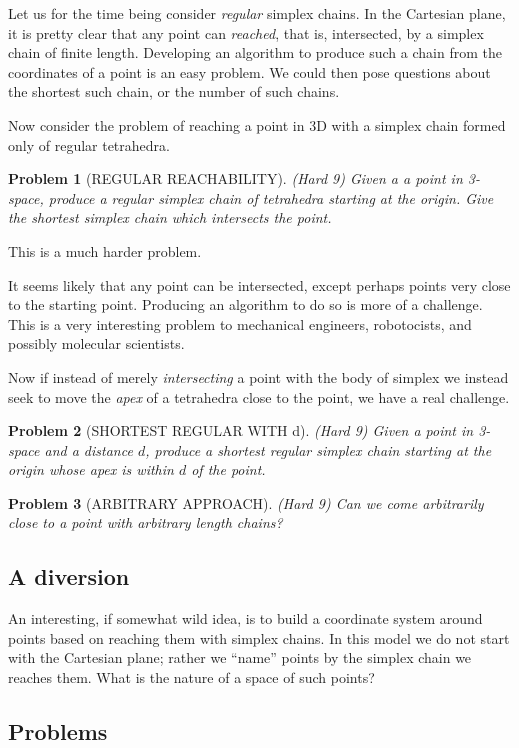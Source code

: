\documentclass[11pt]{article}
\newtheorem{problem}{Problem}
\begin{document}
Let us for the time being consider {\em regular} simplex chains.  In the Cartesian plane, it is pretty clear that any point can {\em reached},
that is, intersected, by a simplex chain of finite length. Developing an algorithm to produce such a chain from the coordinates of a point
is an easy problem. We could then pose questions about the shortest such chain, or the number of such chains.

Now consider the problem of reaching a point in 3D with a simplex chain formed only of regular tetrahedra.
\begin{problem}[REGULAR REACHABILITY]
  (Hard 9)  Given a a point in 3-space, produce a regular simplex chain of tetrahedra starting at the origin.
  Give the shortest simplex chain which intersects the point.
\end{problem}
This is a much harder problem.

It seems likely that any point can be intersected, except perhaps points very close to the starting point. Producing an algorithm to do so
is more of a challenge. This is a very interesting problem to mechanical engineers, robotocists, and possibly molecular scientists.

Now if instead of merely {\em intersecting} a point with the body of simplex we instead seek to move the {\em apex} of a tetrahedra close
to the point, we have a real challenge.
\begin{problem}[SHORTEST REGULAR WITH d]
  (Hard 9) Given a point in 3-space and a distance $d$, produce a shortest regular simplex chain starting at the origin whose apex
  is within $d$ of the point.
\end{problem}

\begin{problem}[ARBITRARY APPROACH]
(Hard 9) Can we come arbitrarily close to a point with arbitrary length chains?
\end{problem}

\subsection{A diversion}
An interesting, if somewhat wild idea, is to build a coordinate system around points based on reaching them with simplex chains. In this model
we do not start with the Cartesian plane; rather we ``name'' points by the simplex chain we reaches them. What is the nature of a space
of such points? 


\subsection{Problems}
\end{document}
